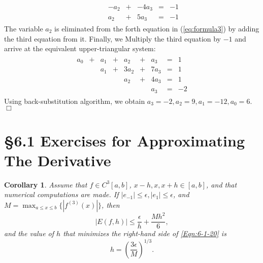 \documentclass[UTF8,12pt,hyperref]{ctexart}
\newtheorem{corollary}{Corollary}
\newenvironment{solve}[1][\color{blue}\bf Solve]{\begin{trivlist}
\item[\hskip \labelsep {\color{blue}\bfseries
#1}]}{\hfill$\Box$\end{trivlist}}
\begin{document}
\begin{solve}
\begin{equation}
\begin{aligned}
\begin{array}{rcrcrcrcr}
                 &    &  &  & -a_2 &+  & -4a_3 &=&-1  \\
                 &    & &  & a_2 &+ & 5a_3 &=&-1
         \end{array}
      \end{aligned}
      \label{eq:formula3}
   \end{equation}
   The variable $a_2$ is eliminated from the forth equation in (\ref{eq:formula3}) by 
   adding the third equation from it. Finally, we Multiply the third equation by $-1$ and arrive at the equivalent
   upper-triangular system:
   \begin{equation}
      \begin{aligned}
      \begin{array}{rcrcrcrcr}
         a_0 & + & a_1   &+ & a_2 & +  & a_3 &=&1   \\
                 &    & a_1 &+ & 3a_2& + & 7a_3 &=&1  \\
                 &    &  &  & a_2 &+  & 4a_3 &=&1  \\
                 &    & &  &  & & a_3 &=&-2
         \end{array}
      \end{aligned}
      \label{eq:formula4}
   \end{equation}
   Using back-substitution algorithm, we obtain
   $a_3=-2,a_2=9,a_1=-12,a_0=6$.
\end{solve}
   


\section*{\S 6.1  Exercises for Approximating The Derivative}


\begin{corollary}\label{Cor:6-1b}\vspace{-0.18cm} 
Assume that $f \in C^3[a, b]$, $x- h, x, x+h\in [a, b]$, and that numerical computations are made. If $|e_{-1}| \leq \epsilon, |e_1| \leq \epsilon$, and $M = \max_{a \leq x \leq b}\{|f^{(3)}(x)|\}$, then
\begin{equation}\label{Eqn:6-1-20}
|E(f, h)| \leq \dfrac{\epsilon}{h} + \dfrac{Mh^2}{6},  
\end{equation}
and the value of $h$ that minimizes the right-hand side of \eqref{Eqn:6-1-20} is \vspace{-0.28cm} 
\begin{equation}\label{Eqn:6-1-21}
h = \left( \dfrac{3\epsilon}{M} \right)^{1/3}. 
\end{equation}
\end{corollary}  
 
\end{document}
